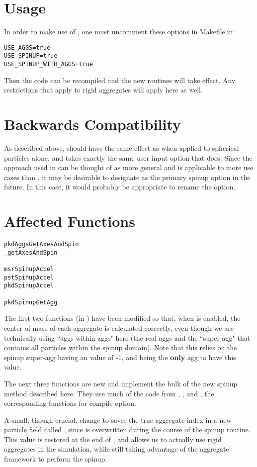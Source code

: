 \section{Usage}
In order to make use of , one must uncomment
these options in Makefile.in:
\begin{verbatim}
USE_AGGS=true
USE_SPINUP=true
USE_SPINUP_WITH_AGGS=true
\end{verbatim}
Then the code can be recompiled and the new routines will take effect. Any restrictions that apply to rigid aggregates will apply here as well.

\section{Backwards Compatibility}

As described above,  should have the same effect as  when applied to spherical particles alone, and takes exactly the same user input option that  does. Since the approach used in  can be thought of as more general and is applicable to more use cases than , it may be desirable to designate  as the primary spinup option in the future. In this case, it would probably be appropriate to rename the option.

\section{Affected Functions}
\begin{verbatim}
pkdAggsGetAxesAndSpin
_getAxesAndSpin

msrSpinupAccel
pstSpinupAccel
pkdSpinupAccel

pkdSpinupGetAgg
\end{verbatim} 

The first two functions (in ) have been modified so that, when  is enabled, the center of mass of each aggregate is calculated correctly, even though we are technically using ``aggs within aggs" here (the real aggs and the ``super-agg" that contains all particles within the spinup domain). Note that this relies on the spinup super-agg having an  value of -1, and being the \textbf{only} agg to have this value.

The next three functions are new and implement the bulk of the new spinup method described here. They use much of the code from , , and , the corresponding functions for  compile option.

A small, though crucial, change to  saves the true aggregate index in a new particle field called , since  is overwritten during the course of the spinup routine. This value is restored at the end of , and allows us to actually use rigid aggregates in the simulation, while still taking advantage of the aggregate framework to perform the spinup.

